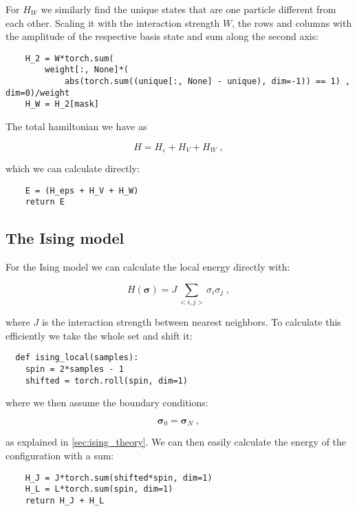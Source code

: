 For $H_W$ we similarly find the unique states that are one particle different from each other. Scaling it with the interaction strength $W$, the rows and columns with the amplitude of the respective basis state and sum along the second axis:

\begin{verbatim} 
    H_2 = W*torch.sum(
        weight[:, None]*(
            abs(torch.sum((unique[:, None] - unique), dim=-1)) == 1) , dim=0)/weight
    H_W = H_2[mask]
\end{verbatim}

The total hamiltonian we have as

\[
  H = H_{\varepsilon} + H_V + H_W \; ,
\]

which we can calculate directly:

\begin{verbatim} 
    E = (H_eps + H_V + H_W)
    return E
\end{verbatim}


\subsection{The Ising model}

For the Ising model we can calculate the local energy directly with:

\begin{equation}
  H(\boldsymbol{\sigma}) = J\sum_{<i,j>}\sigma_i\sigma_j \; ,
  \label{eq:imp_hamil_ising}
\end{equation}

where $J$ is the interaction strength between nearest neighbors. To calculate this efficiently we take the whole set and shift it:

\begin{verbatim}
  def ising_local(samples):
    spin = 2*samples - 1
    shifted = torch.roll(spin, dim=1)
\end{verbatim}

where we then assume the boundary conditions:

\begin{equation}
  \mathbf{\sigma}_0 = \mathbf{\sigma}_N \; ,
  \label{eq:ising_boundary_imp}
\end{equation}

as explained in \ref{sec:ising_theory}. We can then easily calculate the energy of the configuration with a sum:

\begin{verbatim}
    H_J = J*torch.sum(shifted*spin, dim=1)
    H_L = L*torch.sum(spin, dim=1)
    return H_J + H_L
\end{verbatim}

